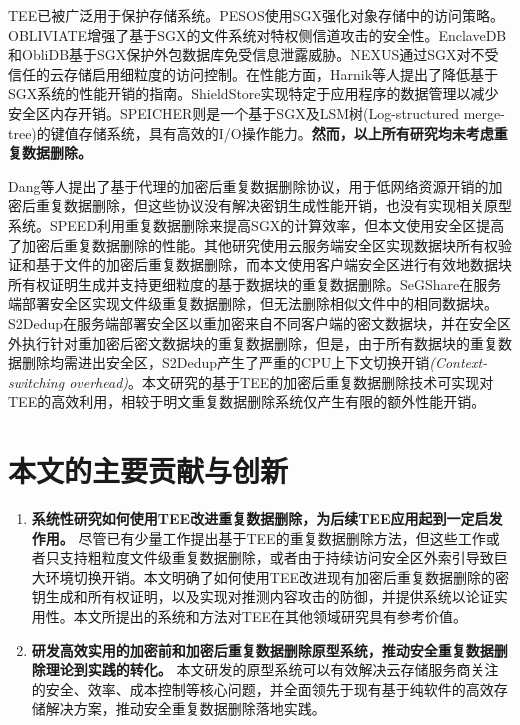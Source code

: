 TEE已被广泛用于保护存储系统。PESOS\cite{krahn2018PESOS}使用SGX强化对象存储中的访问策略。OBLIVIATE\cite{ahmad2018OBLIVIATE}增强了基于SGX的文件系统对特权侧信道攻击的安全性。EnclaveDB\cite{priebe18}和ObliDB\cite{eskandarian19}基于SGX保护外包数据库免受信息泄露威胁。NEXUS\cite{djoko2019NEXUS}通过SGX对不受信任的云存储启用细粒度的访问控制。在性能方面，Harnik等人\cite{harnik2018SGX}提出了降低基于SGX系统的性能开销的指南。ShieldStore\cite{kim2019ShieldStore}实现特定于应用程序的数据管理以减少安全区内存开销。SPEICHER\cite{bailleu2019SPEICHER}则是一个基于SGX及LSM树(Log-structured merge-tree)\cite{LSMT}的键值存储系统，具有高效的I/O操作能力。\textbf{然而，以上所有研究均未考虑重复数据删除。}

Dang等人\cite{dang2017Privacy}提出了基于代理的加密后重复数据删除协议，用于低网络资源开销的加密后重复数据删除，但这些协议没有解决密钥生成性能开销，也没有实现相关原型系统。SPEED\cite{cui2019SPEED}利用重复数据删除来提高SGX的计算效率，但本文使用安全区提高了加密后重复数据删除的性能。其他研究使用云服务端安全区实现数据块所有权验证\cite{you2020Proofs}和基于文件的加密后重复数据删除\cite{fuhry2020segshare}，而本文使用客户端安全区进行有效地数据块所有权证明生成并支持更细粒度的基于数据块的重复数据删除。SeGShare\cite{fuhry2020segshare}在服务端部署安全区实现文件级重复数据删除，但无法删除相似文件中的相同数据块。S2Dedup\cite{miranda2021S2Dedup}在服务端部署安全区以重加密来自不同客户端的密文数据块，并在安全区外执行针对重加密后密文数据块的重复数据删除，但是，由于所有数据块的重复数据删除均需进出安全区，S2Dedup产生了严重的CPU上下文切换开销\textit{(Context-switching overhead)}\cite{weisse2017regaining}。本文研究的基于TEE的加密后重复数据删除技术可实现对TEE的高效利用，相较于明文重复数据删除系统仅产生有限的额外性能开销。

\section{本文的主要贡献与创新}

\begin{enumerate}[leftmargin=0em]
    \item \textbf{系统性研究如何使用TEE改进重复数据删除，为后续TEE应用起到一定启发作用。}
          尽管已有少量工作提出基于TEE的重复数据删除方法，但这些工作或者只支持粗粒度文件级重复数据删除\cite{fuhry2020segshare}，或者由于持续访问安全区外索引导致巨大环境切换开销\cite{miranda2021S2Dedup}。本文明确了如何使用TEE改进现有加密后重复数据删除的密钥生成和所有权证明，以及实现对推测内容攻击的防御，并提供系统以论证实用性。本文所提出的系统和方法对TEE在其他领域研究具有参考价值。
    \item \textbf{研发高效实用的加密前和加密后重复数据删除原型系统，推动安全重复数据删除理论到实践的转化。}
          本文研发的原型系统可以有效解决云存储服务商关注的安全、效率、成本控制等核心问题，并全面领先于现有基于纯软件的高效存储解决方案，推动安全重复数据删除落地实践。
\end{enumerate}

